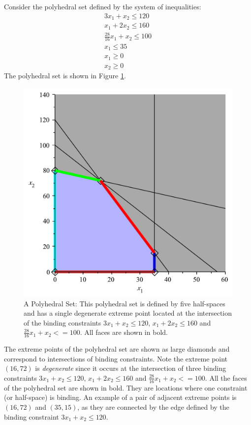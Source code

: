\begin{example} Consider the polyhedral set defined by the system of inequalities:
\begin{gather*}
3x_1 + x_2 \leq 120\\
x_1 + 2x_2 \leq 160\\
\frac{28}{16}x_1+x_2 \leq 100\\
x_1 \leq 35\\
x_1 \geq 0\\
x_2 \geq 0
\end{gather*}
The polyhedral set is shown in Figure \ref{fig:PolyhedralSet}.
\begin{figure}[htbp]
\centering
\includegraphics[scale=0.35]{PolyhedronExample.pdf}
\caption{A Polyhedral Set: This polyhedral set is defined by five half-spaces and has a single degenerate extreme point located at the intersection of the binding constraints $3x_1 + x_2 \leq 120$, $x_1 + 2x_2 \leq 160$ and $\frac{28}{16}x_1+x_2 <= 100$. All faces are shown in bold.}
\label{fig:PolyhedralSet}
\end{figure}
The extreme points of the polyhedral set are shown as large diamonds and correspond to intersections of binding constraints. Note the extreme point $(16,72)$ is \textit{degenerate} since it occurs at the intersection of three binding constraints $3x_1 + x_2 \leq 120$, $x_1 + 2x_2 \leq 160$ and $\frac{28}{16}x_1+x_2 <= 100$. All the faces of the polyhedral set are shown in bold. They are locations where one constraint (or half-space) is binding. An example of a pair of adjacent extreme points is $(16,72)$ and $(35,15)$, as they are connected by the edge defined by the binding constraint $3x_1 + x_2 \leq 120$.
\label{ex:ToyMakerDegen}
\end{example}

